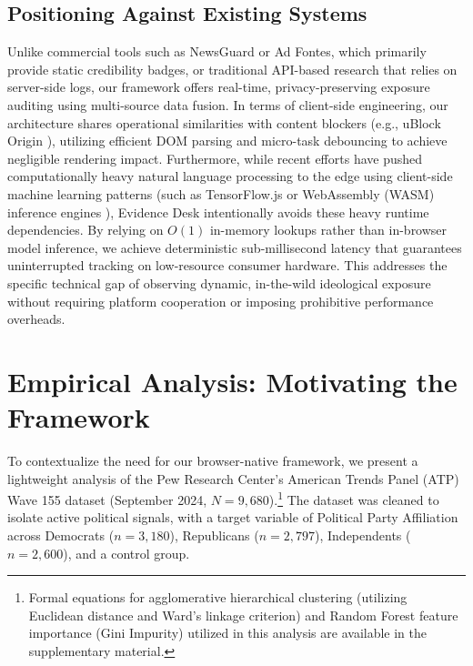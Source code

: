 \documentclass[10pt, conference, compsoc]{IEEEtran}
\begin{document}
\subsection{Positioning Against Existing Systems}
Unlike commercial tools such as NewsGuard or Ad Fontes, which primarily provide static credibility badges, or traditional API-based research that relies on server-side logs, our framework offers real-time, privacy-preserving exposure auditing using multi-source data fusion. In terms of client-side engineering, our architecture shares operational similarities with content blockers (e.g., uBlock Origin \cite{hill2014ublock}), utilizing efficient DOM parsing and micro-task debouncing to achieve negligible rendering impact. Furthermore, while recent efforts have pushed computationally heavy natural language processing to the edge using client-side machine learning patterns (such as TensorFlow.js \cite{smilkov2019tensorflow} or WebAssembly (WASM) inference engines \cite{haas2017bringing}), Evidence Desk intentionally avoids these heavy runtime dependencies. By relying on $O(1)$ in-memory lookups rather than in-browser model inference, we achieve deterministic sub-millisecond latency that guarantees uninterrupted tracking on low-resource consumer hardware. This addresses the specific technical gap of observing dynamic, in-the-wild ideological exposure without requiring platform cooperation or imposing prohibitive performance overheads.


\section{Empirical Analysis: Motivating the Framework}
To contextualize the need for our browser-native framework, we present a lightweight analysis of the Pew Research Center's American Trends Panel (ATP) Wave 155 dataset (September 2024, $N=9,680$).\footnote{Formal equations for agglomerative hierarchical clustering (utilizing Euclidean distance and Ward's linkage criterion) and Random Forest feature importance (Gini Impurity) utilized in this analysis are available in the supplementary material.} The dataset was cleaned to isolate active political signals, with a target variable of Political Party Affiliation across Democrats ($n=3,180$), Republicans ($n=2,797$), Independents ($n=2,600$), and a control group. 
\end{document}
